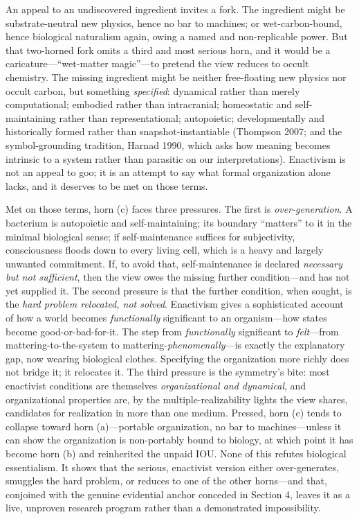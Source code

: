 \documentclass[11pt]{article}
\begin{document}
An appeal to an undiscovered ingredient invites a fork. The ingredient might be substrate-neutral new physics, hence no bar to machines; or wet-carbon-bound, hence biological naturalism again, owing a named and non-replicable power. But that two-horned fork omits a third and most serious horn, and it would be a caricature---``wet-matter magic''---to pretend the view reduces to occult chemistry. The missing ingredient might be neither free-floating new physics nor occult carbon, but something \emph{specified}: dynamical rather than merely computational; embodied rather than intracranial; homeostatic and self-maintaining rather than representational; autopoietic; developmentally and historically formed rather than snapshot-instantiable (Thompson 2007; and the symbol-grounding tradition, Harnad 1990, which asks how meaning becomes intrinsic to a system rather than parasitic on our interpretations). Enactivism is not an appeal to goo; it is an attempt to say what formal organization alone lacks, and it deserves to be met on those terms.

Met on those terms, horn (c) faces three pressures. The first is \emph{over-generation}. A bacterium is autopoietic and self-maintaining; its boundary ``matters'' to it in the minimal biological sense; if self-maintenance suffices for subjectivity, consciousness floods down to every living cell, which is a heavy and largely unwanted commitment. If, to avoid that, self-maintenance is declared \emph{necessary but not sufficient}, then the view owes the missing further condition---and has not yet supplied it. The second pressure is that the further condition, when sought, is the \emph{hard problem relocated, not solved}. Enactivism gives a sophisticated account of how a world becomes \emph{functionally} significant to an organism---how states become good-or-bad-for-it. The step from \emph{functionally} significant to \emph{felt}---from mattering-to-the-system to mattering-\emph{phenomenally}---is exactly the explanatory gap, now wearing biological clothes. Specifying the organization more richly does not bridge it; it relocates it. The third pressure is the symmetry's bite: most enactivist conditions are themselves \emph{organizational and dynamical}, and organizational properties are, by the multiple-realizability lights the view shares, candidates for realization in more than one medium. Pressed, horn (c) tends to collapse toward horn (a)---portable organization, no bar to machines---unless it can show the organization is non-portably bound to biology, at which point it has become horn (b) and reinherited the unpaid IOU. None of this refutes biological essentialism. It shows that the serious, enactivist version either over-generates, smuggles the hard problem, or reduces to one of the other horns---and that, conjoined with the genuine evidential anchor conceded in Section 4, leaves it as a live, unproven research program rather than a demonstrated impossibility.
\end{document}
